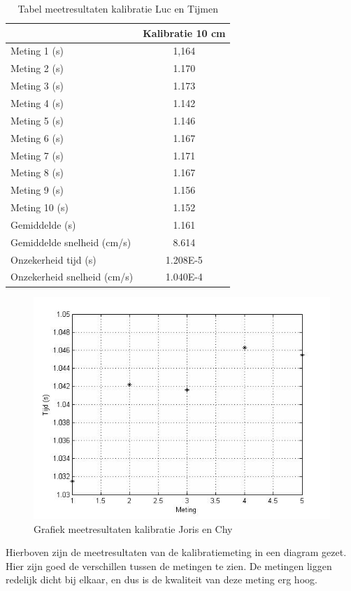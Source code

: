 \documentclass{report}
\begin{document}
\begin{table}
 \centering
\begin{tabular}{| l| c|}
\hline
    & Kalibratie 10 cm \\
\hline
   Meting 1 (s) & 1,164 \\
\hline
   Meting 2 (s) & 1.170 \\
\hline
   Meting 3 (s) & 1.173 \\
\hline
   Meting 4 (s) & 1.142 \\
\hline
   Meting 5 (s) & 1.146 \\
\hline
   Meting 6 (s) & 1.167 \\
\hline
   Meting 7 (s) & 1.171 \\
\hline
   Meting 8 (s) & 1.167 \\
\hline
   Meting 9 (s) & 1.156 \\
\hline
   Meting 10 (s) & 1.152 \\
\hline
   Gemiddelde (s) & 1.161 \\
\hline
   Gemiddelde snelheid (cm/s) & 8.614 \\
\hline
   Onzekerheid tijd (s) & 1.208E-5
 \\
\hline
   Onzekerheid snelheid (cm/s) & 1.040E-4 \\
\hline
\end{tabular}
\caption{Tabel meetresultaten kalibratie Luc en Tijmen}
\end{table}

\begin{figure}[H]
 \centering
\includegraphics[width=150mm] {grafiekmeetresultaten.jpg}
\caption{Grafiek meetresultaten kalibratie Joris en Chy}
\end{figure}
Hierboven zijn de meetresultaten van de kalibratiemeting in een diagram gezet. Hier zijn goed de verschillen tussen de metingen te zien. De metingen liggen redelijk dicht bij elkaar, en dus is de kwaliteit van deze meting erg hoog.
\end{document}
